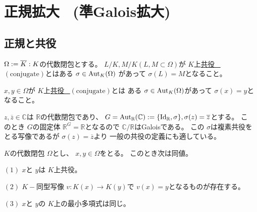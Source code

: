 \documentclass[../master_galois_theory]{subfiles}
\begin{document}
\setcounter{section}{10}

\section{正規拡大 \  (準Galois拡大)}

\subsection{正規と共役}

\begin{defi}
  $\Omega := \overline{K} : K$の代数閉包とする。
  $L/K , M/K (L , M \subset \Omega)$が $K$上\underline{共役 \  $(\mathrm{conjugate})$}とはある $\sigma \in \mathrm{Aut}_K(\Omega)$
  があって $\sigma (L) = M$となること。

  $x , y \in \Omega$が $K$上\underline{共役 \  $(\mathrm{conjugate})$}とは
  ある $\sigma \in \mathrm{Aut}_K(\Omega)$があって $\sigma(x) = y$となること。
\end{defi}

\begin{exam}
  $z , \overline{z} \in \mathbb{C}$は $\mathbb{R}$の代数閉包であり、
  $G = \mathrm{Aut}_{\mathbb{R}}(\mathbb{C}) := \{ \mathrm{Id}_{\mathbb{R}} , \sigma \} , \sigma(z) = \overline{z}$とする。
  このとき $G$の固定体 $\mathbb{R}^G = \mathbb{R}$となるので $\mathbb{C}/\mathbb{R}$は\rm{Galois}である。
  この $\sigma$は複素共役をとる写像であるが $\sigma(z) = \overline{z}$より
  一般の共役の定義にも適している。
\end{exam}

\begin{prop}
  $K$の代数閉包 $\Omega$とし、
  $x , y \in \Omega$をとる。
  このとき次は同値。

  $(1)$
  $x$と $y$は $K$上共役。

  $(2)$
  $K-$同型写像 $v : K(x) \longrightarrow K(y)$で
  $v(x) = y$となるものが存在する。

  $(3)$
  $x$と $y$の $K$上の最小多項式は同じ。
\end{prop}
\end{document}
